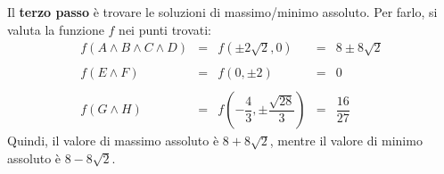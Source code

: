 \documentclass[a4paper]{article}
\begin{document}
	\noindent
	Il \textbf{terzo passo} è trovare le soluzioni di massimo/minimo assoluto. Per farlo, si valuta la funzione $f$ nei punti trovati:
	\begin{equation*}
		\begin{array}{rclcl}
			f\left(A \land B \land C \land D\right) &=& f\left(\pm 2\sqrt{2}, 0\right) &=& 8 \pm 8\sqrt{2} \\
			\\
			f\left(E \land F\right) &=& f\left(0, \pm 2\right) &=& 0 \\
			\\
			f\left(G \land H\right) &=& f\left(-\dfrac{4}{3}, \pm \dfrac{\sqrt{28}}{3}\right) &=& \dfrac{16}{27}
		\end{array}
	\end{equation*}
	Quindi, il valore di massimo assoluto è $8 + 8\sqrt{2}$, mentre il valore di minimo assoluto è $8 - 8\sqrt{2}$.\newpage
\end{document}
